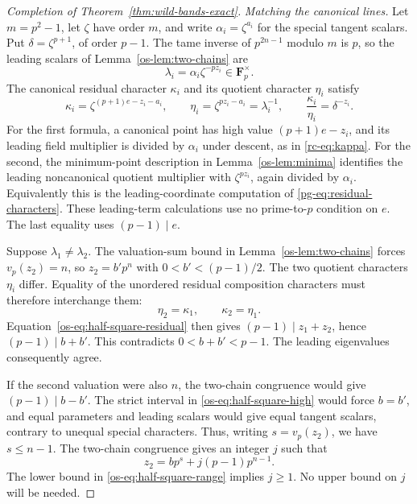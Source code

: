 \begin{proof}[Completion of Theorem~\ref{thm:wild-bands-exact}]
\smallskip\noindent
\emph{Matching the canonical lines.}
Let $m=p^2-1$, let $\zeta$ have order $m$, and write
$\alpha_i=\zeta^{a_i}$ for the special tangent scalars.  Put
$\delta=\zeta^{p+1}$, of order $p-1$.  The tame inverse of
$p^{2n-1}$ modulo $m$ is $p$, so the leading scalars of
Lemma~\ref{os-lem:two-chains} are
\[
 \lambda_i=\alpha_i\zeta^{-pz_i}\in\mathbf F_p^{\times}.
\]
The canonical residual character $\kappa_i$ and its quotient
character $\eta_i$ satisfy
\begin{equation}\label{os-eq:half-square-residual}
 \kappa_i=\zeta^{(p+1)e-z_i-a_i},
 \qquad
 \eta_i=\zeta^{pz_i-a_i}=\lambda_i^{-1},
 \qquad
 \frac{\kappa_i}{\eta_i}=\delta^{-z_i}.
\end{equation}
For the first formula, a canonical point has high value
$(p+1)e-z_i$, and its leading field multiplier is divided by
$\alpha_i$ under descent, as in \eqref{rc-eq:kappa}.
For the second, the minimum-point description in
Lemma~\ref{os-lem:minima} identifies the leading noncanonical
quotient multiplier with $\zeta^{pz_i}$, again divided by
$\alpha_i$.  Equivalently this is the leading-coordinate computation
of \eqref{pg-eq:residual-characters}.  These leading-term calculations
use no prime-to-$p$ condition on $e$.  The last equality uses
$(p-1)\mid e$.

Suppose $\lambda_1\ne\lambda_2$.  The valuation-sum bound in
Lemma~\ref{os-lem:two-chains} forces $v_p(z_2)=n$, so
$z_2=b'p^n$ with $0<b'<(p-1)/2$.  The two quotient characters
$\eta_i$ differ.  Equality of the unordered residual composition
characters must therefore interchange them:
\[
 \eta_2=\kappa_1,\qquad \kappa_2=\eta_1.
\]
Equation~\eqref{os-eq:half-square-residual} then gives
$(p-1)\mid z_1+z_2$, hence $(p-1)\mid b+b'$.  This contradicts
$0<b+b'<p-1$.  The leading eigenvalues consequently agree.

If the second valuation were also $n$, the two-chain congruence
would give $(p-1)\mid b-b'$.  The strict interval in
\eqref{os-eq:half-square-high} would force $b=b'$, and equal
parameters and leading scalars would give equal tangent scalars,
contrary to unequal special characters.  Thus, writing
$s=v_p(z_2)$, we have $s\le n-1$.  The two-chain congruence gives
an integer $j$ such that
\begin{equation}\label{os-eq:half-square-partner}
 z_2=bp^s+j(p-1)p^{n-1}.
\end{equation}
The lower bound in \eqref{os-eq:half-square-range} implies $j\ge1$.
No upper bound on $j$ will be needed.


\end{proof}
